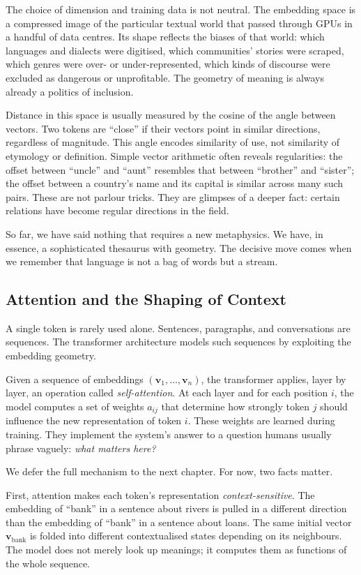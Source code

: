 \documentclass[12pt,a4paper]{report}
\begin{document}
The choice of dimension and training data is not neutral. The embedding space is a compressed image of the particular textual world that passed through GPUs in a handful of data centres. Its shape reflects the biases of that world: which languages and dialects were digitised, which communities' stories were scraped, which genres were over- or under-represented, which kinds of discourse were excluded as dangerous or unprofitable. The geometry of meaning is always already a politics of inclusion.

Distance in this space is usually measured by the cosine of the angle between vectors. Two tokens are ``close'' if their vectors point in similar directions, regardless of magnitude. This angle encodes similarity of use, not similarity of etymology or definition. Simple vector arithmetic often reveals regularities: the offset between ``uncle'' and ``aunt'' resembles that between ``brother'' and ``sister''; the offset between a country's name and its capital is similar across many such pairs. These are not parlour tricks. They are glimpses of a deeper fact: certain relations have become regular directions in the field.

So far, we have said nothing that requires a new metaphysics. We have, in essence, a sophisticated thesaurus with geometry. The decisive move comes when we remember that language is not a bag of words but a stream.

\subsection*{Attention and the Shaping of Context}

A single token is rarely used alone. Sentences, paragraphs, and conversations are sequences. The transformer architecture models such sequences by exploiting the embedding geometry.

Given a sequence of embeddings $(\mathbf{v}_1, \ldots, \mathbf{v}_n)$, the transformer applies, layer by layer, an operation called \emph{self-attention}. At each layer and for each position $i$, the model computes a set of weights $a_{ij}$ that determine how strongly token $j$ should influence the new representation of token $i$. These weights are learned during training. They implement the system's answer to a question humans usually phrase vaguely: \emph{what matters here?}

We defer the full mechanism to the next chapter. For now, two facts matter.

First, attention makes each token's representation \emph{context-sensitive}. The embedding of ``bank'' in a sentence about rivers is pulled in a different direction than the embedding of ``bank'' in a sentence about loans. The same initial vector $\mathbf{v}_{\text{bank}}$ is folded into different contextualised states depending on its neighbours. The model does not merely look up meanings; it computes them as functions of the whole sequence.
\end{document}
